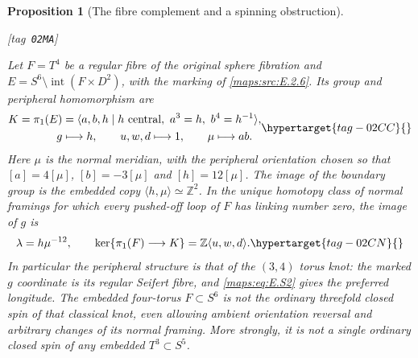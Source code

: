 \documentclass[11pt,a4paper]{article}
\makeatletter
\numberwithin{equation}{section}
\newtheorem{proposition}[proposition]{Proposition}
\theoremstyle{definition}
\newcommand{\StatementRecord}[4]{{\upshape\footnotesize[tag~\texttt{#3}]}\enspace\ignorespaces}
\newcommand{\SeriesRefText}[1]{\ifcsname SRef@#1\endcsname\csname SRef@#1\endcsname\else\textbf{UNRESOLVED}\fi}
\newcommand{\SeriesRef}[1]{\ifmmode\text{\SeriesRefText{#1}}\else\SeriesRefText{#1}\fi}
\makeatother
\begin{document}
\begin{proposition}[The fibre complement and a spinning obstruction]\hypertarget{tag-02MA}{}\label{maps:src:E.2.10}
\StatementRecord{maps:src:E.2.10}{proved}{02MA}{\cref{maps:src:E.2.6}, \SeriesRef{maps:src:B.5.2}, \eqref{maps:eq:E.MV4}, \eqref{maps:eq:E.MV6}, \eqref{maps:eq:E.S5}, \eqref{maps:eq:E.S4}; \cite[Section 3, immediately before Theorem 3.4]{mapsWinter08}; \cite[Theorem 4.5]{mapsWinter08}}


Let $F=T^4$ be a regular fibre of the original sphere fibration and
$E=S^6\setminus\operatorname{int}(F\times D^2)$, with the marking of
\ref{maps:src:E.2.6}. Its group and peripheral homomorphism are
\begin{equation}
 \begin{split}
 K=\pi_1(E)&=\langle a,b,h\mid h\text{ central},\ a^3=h,
                                      \ b^4=h^{-1}\rangle,\\
 g&\longmapsto h,\qquad u,w,d\longmapsto1,
       \qquad \mu\longmapsto ab.
 \end{split}
 \hypertarget{tag-02CC}{}\label{maps:eq:E.S1}
\end{equation}
Here $\mu$ is the normal meridian, with the peripheral orientation
chosen so that $[a]=4[\mu]$, $[b]=-3[\mu]$ and $[h]=12[\mu]$.
The image of the boundary group is the embedded copy
$\langle h,\mu\rangle\simeq\mathbb Z^2$. In the unique homotopy
class of normal framings for which every pushed-off loop of $F$
has linking number zero, the image of $g$ is
\begin{equation}
             \lambda=h\mu^{-12},
 \qquad \ker\{\pi_1(F)\longrightarrow K\}
                 =\mathbb Z\langle u,w,d\rangle.
 \hypertarget{tag-02CN}{}\label{maps:eq:E.S2}
\end{equation}
In particular the peripheral structure is that of the $(3,4)$
torus knot: the marked $g$ coordinate is its regular Seifert fibre,
and \eqref{maps:eq:E.S2} gives the preferred longitude. The embedded
four-torus $F\subset S^6$ is not the ordinary threefold closed spin
of that classical knot, even allowing ambient orientation reversal
and arbitrary changes of its normal framing. More strongly, it is
not a single ordinary closed spin of any embedded $T^3\subset S^5$.

\end{proposition}
\end{document}

